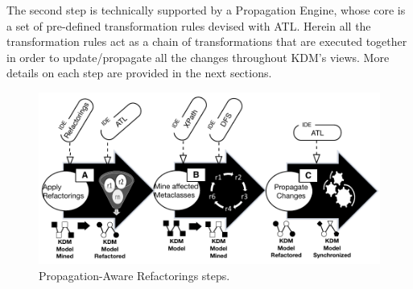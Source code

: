 The second step is technically supported by a Propagation Engine, whose core is a set of pre-defined transformation rules devised with ATL. Herein all the transformation rules act as a chain of transformations that are executed together in order to update/propagate all the changes throughout KDM's views. More details on each step are provided in the next sections.





\begin{figure}[h]
	\centering
	\includegraphics[scale=0.54]{figuras/approachSteps}
	\caption{Propagation-Aware Refactorings steps.}
	\label{fig:approach}
\end{figure}


